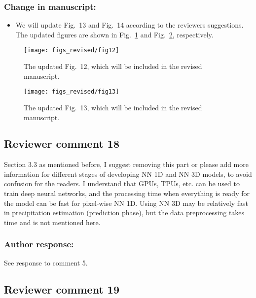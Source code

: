 \subsubsection*{Change in manuscript:}

\begin{itemize}
  \item We will update Fig.~13 and Fig.~14 according to the reviewers suggestions. The updated
    figures are shown in Fig.~\ref{fig:harvey_gmi} and Fig.~\ref{fig:harvey_mhs}, respectively.
\end{itemize}

\begin{figure}[hbpt]
  \centering
  \texttt{[image: figs\_revised/fig12]}
  \caption{
    The updated Fig.~12, which will be included in the revised manuscript.
  }
  \label{fig:harvey_gmi}
\end{figure}

\begin{figure}[hbpt]
  \centering
  \texttt{[image: figs\_revised/fig13]}
  \caption{
    The updated Fig.~13, which will be included in the revised manuscript.
  }
  \label{fig:harvey_mhs}
\end{figure}

\subsection*{Reviewer comment 18}

Section 3.3 as mentioned before, I suggest removing this part or please add more information for
different stages of developing NN 1D and NN 3D models, to avoid confusion for the readers. I
understand that GPUs, TPUs, etc. can be used to train deep neural networks, and the processing
time when everything is ready for the model can be fast for pixel-wise NN 1D. Using NN 3D may
be relatively fast in precipitation estimation (prediction phase), but the data preprocessing takes
time and is not mentioned here.

\subsubsection*{Author response:}

See response to comment 5.


\subsection*{Reviewer comment 19}


